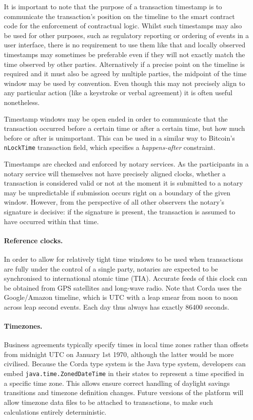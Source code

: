 \documentclass{article}
\begin{document}
It is important to note that the purpose of a transaction timestamp is to communicate the transaction's position on
the timeline to the smart contract code for the enforcement of contractual logic. Whilst such timestamps may also
be used for other purposes, such as regulatory reporting or ordering of events in a user interface, there is no
requirement to use them like that and locally observed timestamps may sometimes be preferable even if they will not
exactly match the time observed by other parties. Alternatively if a precise point on the timeline is required and
it must also be agreed by multiple parties, the midpoint of the time window may be used by convention. Even though
this may not precisely align to any particular action (like a keystroke or verbal agreement) it is often useful
nonetheless.

Timestamp windows may be open ended in order to communicate that the transaction occurred before a certain time or
after a certain time, but how much before or after is unimportant. This can be used in a similar way to Bitcoin's
\texttt{nLockTime} transaction field, which specifies a \emph{happens-after} constraint.

Timestamps are checked and enforced by notary services. As the participants in a notary service will themselves not
have precisely aligned clocks, whether a transaction is considered valid or not at the moment it is submitted to a
notary may be unpredictable if submission occurs right on a boundary of the given window. However, from the
perspective of all other observers the notary's signature is decisive: if the signature is present, the transaction
is assumed to have occurred within that time.

\paragraph{Reference clocks.}In order to allow for relatively tight time windows to be used when transactions are
fully under the control of a single party, notaries are expected to be synchronised to international atomic time
(TIA). Accurate feeds of this clock can be obtained from GPS satellites and long-wave radio. Note that Corda uses
the Google/Amazon timeline\cite{GoogleTime}, which is UTC with a leap smear from noon to noon across leap second events. Each day thus
always has exactly 86400 seconds.

\paragraph{Timezones.}Business agreements typically specify times in local time zones rather than offsets from
midnight UTC on January 1st 1970, although the latter would be more civilised. Because the Corda type system is the
Java type system, developers can embed \texttt{java.time.ZonedDateTime} in their states to represent a time
specified in a specific time zone. This allows ensure correct handling of daylight savings transitions and timezone
definition changes. Future versions of the platform will allow timezone data files to be attached to transactions,
to make such calculations entirely deterministic.
\end{document}
